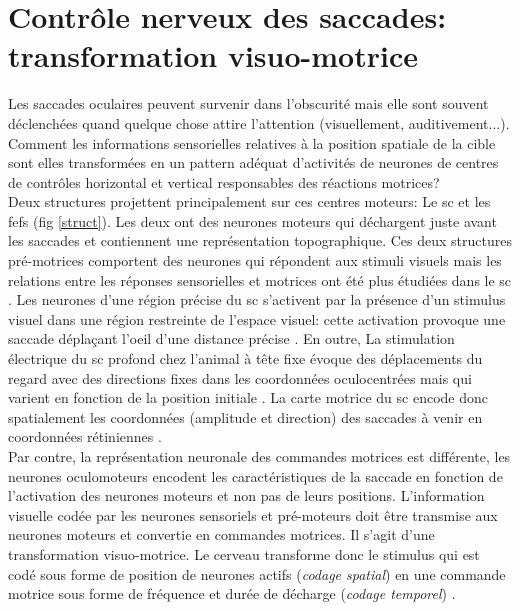\section{Contr\^ole nerveux des saccades: transformation visuo-motrice}

Les saccades oculaires peuvent survenir dans l'obscurité mais elle sont souvent déclenchées quand quelque chose attire l'attention (visuellement, auditivement...). Comment les informations sensorielles relatives à la position spatiale de la cible sont elles transformées en un pattern adéquat d'activités de neurones de centres de contrôles horizontal et vertical responsables des réactions motrices?\\

Deux structures projettent principalement sur ces centres moteurs: Le \gls{sc} et les \glspl{fef} (fig \ref{struct}). Les deux ont des neurones moteurs qui déchargent juste avant les saccades et contiennent une représentation topographique. Ces deux structures pré-motrices comportent des neurones qui répondent aux stimuli visuels mais les relations entre les réponses sensorielles et motrices ont été plus étudiées dans le \gls{sc} \cite{Lefevre:1998, Quaia:1999}. Les neurones d'une région précise du \gls{sc} s'activent par la présence d'un stimulus visuel dans une région restreinte de l'espace visuel: cette activation provoque une saccade déplaçant l'oeil d'une distance précise \cite{Schiller:1972}. En outre, La stimulation électrique du \gls{sc} profond chez l'animal à tête fixe évoque des déplacements du regard avec des directions fixes dans les coordonnées oculocentrées mais qui varient en fonction de la position initiale \cite{Klier:2001}. La carte motrice du \gls{sc} encode donc spatialement les coordonnées (amplitude et direction) des saccades à venir en coordonnées rétiniennes \cite{Hepp:1993, VanOpstal:1991}.\\



Par contre, la représentation neuronale des commandes motrices est différente, les neurones oculomoteurs encodent les caractéristiques de la saccade en fonction de l'activation des neurones moteurs et non pas de leurs positions. L'information visuelle codée par les neurones sensoriels et pré-moteurs doit être transmise aux neurones moteurs et convertie en commandes motrices. Il s'agit d'une transformation visuo-motrice. Le cerveau transforme donc le stimulus qui est codé sous forme de position de neurones actifs (\textit{codage spatial}) en une commande motrice sous forme de fréquence et durée de décharge (\textit{codage temporel}) \cite{Moschovakis:1994, Robinson:1968, Sparks:1990, Sparks:2002}.\\

